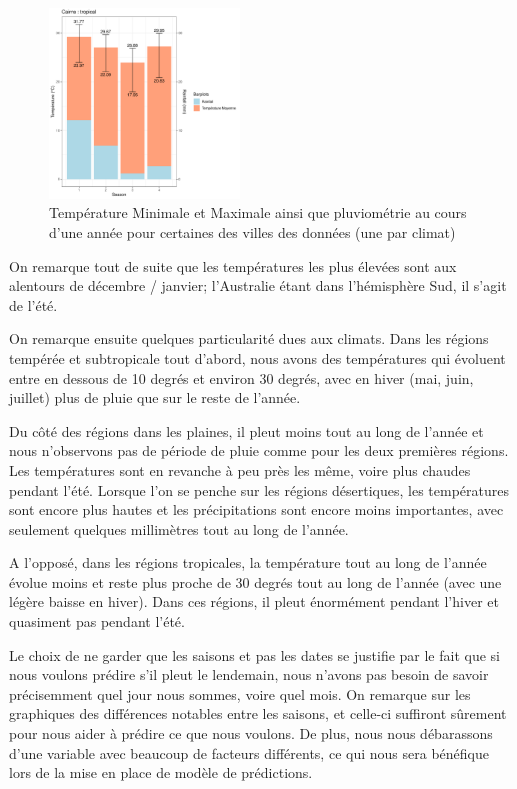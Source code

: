 \documentclass{article}
\begin{document}
\begin{figure}[H]
    \includegraphics[page=1,width=0.45\textwidth]{Images/Temp_and_Rainfalltropical.pdf}
    \caption{Température Minimale et Maximale ainsi que pluviométrie au cours d'une année pour certaines des villes des données (une par climat)}
\end{figure}

On remarque tout de suite que les températures les plus élevées sont aux alentours de décembre / janvier; l'Australie étant dans l'hémisphère Sud, il s'agit de l'été. 

On remarque ensuite quelques particularité dues aux climats. Dans les régions tempérée et subtropicale tout d'abord, nous avons des températures qui évoluent entre en dessous de 10 degrés et environ 30 degrés, avec en hiver (mai, juin, juillet) plus de pluie que sur le reste de l'année.

Du côté des régions dans les plaines, il pleut moins tout au long de l'année et nous n'observons pas de période de pluie comme pour les deux premières régions. Les températures sont en revanche à peu près les même, voire plus chaudes pendant l'été. Lorsque l'on se penche sur les régions désertiques, les températures sont encore plus hautes et les précipitations sont encore moins importantes, avec seulement quelques millimètres tout au long de l'année. 

A l'opposé, dans les régions tropicales, la température tout au long de l'année évolue moins et reste plus proche de 30 degrés tout au long de l'année (avec une légère baisse en hiver). Dans ces régions, il pleut énormément pendant l'hiver et quasiment pas pendant l'été.

Le choix de ne garder que les saisons et pas les dates se justifie par le fait que si nous voulons prédire s'il pleut le lendemain, nous n'avons pas besoin de savoir précisemment quel jour nous sommes, voire quel mois. On remarque sur les graphiques des différences notables entre les saisons, et celle-ci suffiront sûrement pour nous aider à prédire ce que nous voulons. De plus, nous nous débarassons d'une variable avec beaucoup de facteurs différents, ce qui nous sera bénéfique lors de la mise en place de modèle de prédictions.
\end{document}
